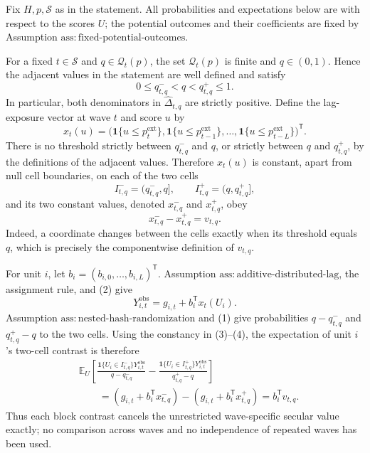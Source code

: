 Fix \(H,p,\mathcal S\) as in the statement.  All probabilities and expectations below are with respect to the scores \(U\); the potential outcomes and their coefficients are fixed by Assumption \(\mathrm{ass:fixed\text{-}potential\text{-}outcomes}\).

For a fixed \(t\in\mathcal S\) and \(q\in\mathcal Q_t(p)\), the set \(\mathcal Q_t(p)\) is finite and \(q\in(0,1)\).  Hence the adjacent values in the statement are well defined and satisfy
\[
 0\le q^-_{t,q}<q<q^+_{t,q}\le1.
\tag{1}
\]
In particular, both denominators in \(\widehat\Delta_{t,q}\) are strictly positive.  Define the lag-exposure vector at wave \(t\) and score \(u\) by
\[
 x_t(u)=\bigl(\mathbf 1\{u\le p^{\mathrm{ext}}_t\},
 \mathbf 1\{u\le p^{\mathrm{ext}}_{t-1}\},\ldots,
 \mathbf 1\{u\le p^{\mathrm{ext}}_{t-L}\}\bigr)^{\mathsf T}.
\tag{2}
\]
There is no threshold strictly between \(q^-_{t,q}\) and \(q\), or strictly between \(q\) and \(q^+_{t,q}\), by the definitions of the adjacent values.  Therefore \(x_t(u)\) is constant, apart from null cell boundaries, on each of the two cells
\[
 I^-_{t,q}=(q^-_{t,q},q],
 \qquad I^+_{t,q}=(q,q^+_{t,q}],
\]
and its two constant values, denoted \(x^-_{t,q}\) and \(x^+_{t,q}\), obey
\[
 x^-_{t,q}-x^+_{t,q}=v_{t,q}.
\tag{3}
\]
Indeed, a coordinate changes between the cells exactly when its threshold equals \(q\), which is precisely the componentwise definition of \(v_{t,q}\).

For unit \(i\), let \(b_i=(b_{i,0},\ldots,b_{i,L})^{\mathsf T}\).  Assumption \(\mathrm{ass:additive\text{-}distributed\text{-}lag}\), the assignment rule, and (2) give
\[
 Y^{\mathrm{obs}}_{i,t}=g_{i,t}+b_i^{\mathsf T}x_t(U_i).
\tag{4}
\]
Assumption \(\mathrm{ass:nested\text{-}hash\text{-}randomization}\) and (1) give probabilities \(q-q^-_{t,q}\) and \(q^+_{t,q}-q\) to the two cells.  Using the constancy in (3)--(4), the expectation of unit \(i\)'s two-cell contrast is therefore
\[
 \begin{aligned}
 &\mathbb E_U\left[
 \frac{\mathbf 1\{U_i\in I^-_{t,q}\}Y^{\mathrm{obs}}_{i,t}}
      {q-q^-_{t,q}}
 -\frac{\mathbf 1\{U_i\in I^+_{t,q}\}Y^{\mathrm{obs}}_{i,t}}
      {q^+_{t,q}-q}
 \right]\\
 &\qquad=(g_{i,t}+b_i^{\mathsf T}x^-_{t,q})
          -(g_{i,t}+b_i^{\mathsf T}x^+_{t,q})
 =b_i^{\mathsf T}v_{t,q}.
 \end{aligned}
\tag{5}
\]
Thus each block contrast cancels the unrestricted wave-specific secular value exactly; no comparison across waves and no independence of repeated waves has been used.

